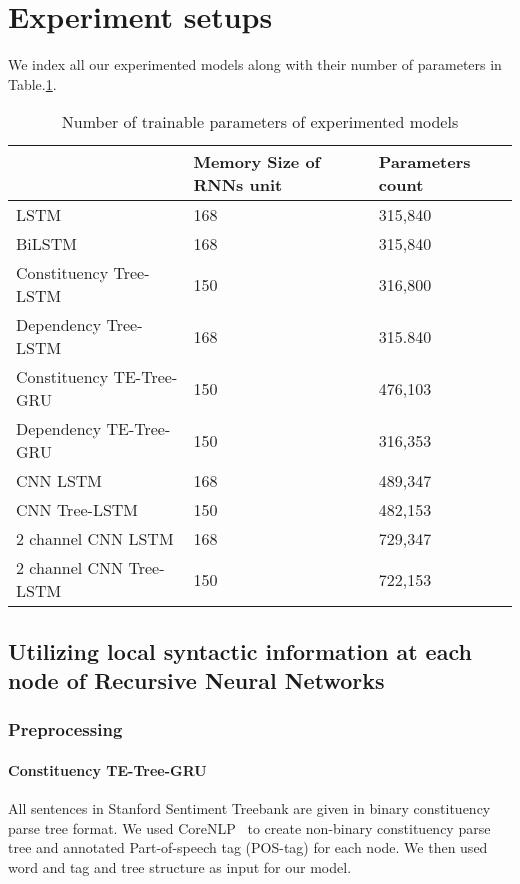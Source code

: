 \section{Experiment setups}
We index all our experimented models along with their number of parameters in Table.\ref{table:paramtable}.

\begin{table}[H]
    \centering
    \caption{Number of trainable parameters of experimented models}
    \label{table:paramtable}
    \begin{tabular}{lll}
        ~ & Memory Size of RNNs unit & Parameters count \\ \hline
        LSTM                     & 168         & 315,840          \\
        BiLSTM                   & 168         & 315,840          \\
        Constituency Tree-LSTM   & 150         & 316,800          \\
        Dependency Tree-LSTM     & 168         & 315.840          \\
        Constituency TE-Tree-GRU & 150         & 476,103          \\
        Dependency TE-Tree-GRU   & 150         & 316,353          \\
        CNN LSTM                 & 168         & 489,347          \\
        CNN Tree-LSTM            & 150         & 482,153          \\
        2 channel CNN LSTM       & 168         & 729,347          \\
        2 channel CNN Tree-LSTM  & 150         & 722,153
    \end{tabular}
\end{table}
\subsection{Utilizing local syntactic information at each node of Recursive Neural Networks}
\subsubsection{Preprocessing}
\paragraph{Constituency TE-Tree-GRU}
All sentences in Stanford Sentiment Treebank are given in binary constituency parse tree format.
We used CoreNLP~\cite{manning2014stanford} to create non-binary constituency parse tree and annotated Part-of-speech tag (POS-tag) for each node. 
We then used word and tag and tree structure as input for our model.


